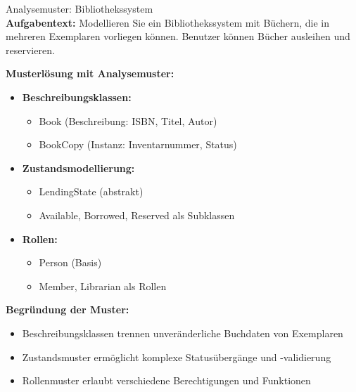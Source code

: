 \begin{example2}{Analysemuster: Bibliothekssystem}\\
\textbf{Aufgabentext:}
Modellieren Sie ein Bibliothekssystem mit Büchern, die in mehreren Exemplaren vorliegen können. Benutzer können Bücher ausleihen und reservieren.

\textbf{Musterlösung mit Analysemuster:}
\begin{itemize}
    \item \textbf{Beschreibungsklassen:}
    \begin{itemize}
        \item Book (Beschreibung: ISBN, Titel, Autor)
        \item BookCopy (Instanz: Inventarnummer, Status)
    \end{itemize}
    
    \item \textbf{Zustandsmodellierung:}
    \begin{itemize}
        \item LendingState (abstrakt)
        \item Available, Borrowed, Reserved als Subklassen
    \end{itemize}
    
    \item \textbf{Rollen:}
    \begin{itemize}
        \item Person (Basis)
        \item Member, Librarian als Rollen
    \end{itemize}
\end{itemize}

\textbf{Begründung der Muster:}
\begin{itemize}
    \item Beschreibungsklassen trennen unveränderliche Buchdaten von Exemplaren
    \item Zustandsmuster ermöglicht komplexe Statusübergänge und -validierung
    \item Rollenmuster erlaubt verschiedene Berechtigungen und Funktionen
\end{itemize}
\end{example2}

